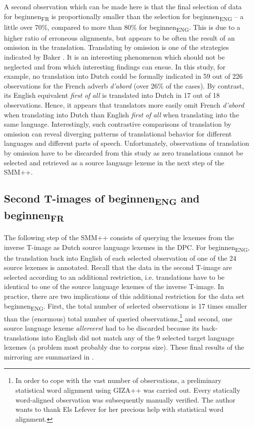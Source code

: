 A second observation which can be made here is that the final selection of data for beginnen\textsubscript{FR} is proportionally smaller than the selection for beginnen\textsubscript{ENG} – a little over 70\%, compared to more than 80\% for beginnen\textsubscript{ENG}. This is due to a higher ratio of erroneous alignments, but appears to be often the result of an omission in the translation. Translating by omission is one of the strategies indicated by Baker \citep[40]{baker_other_1992}. It is an interesting phenomenon which should not be neglected and from which interesting findings can ensue. In this study, for example, no translation into Dutch could be formally indicated in 59 out of 226 observations for the French adverb \textit{d’abord} (over 26\% of the cases). By contrast, its English equivalent \textit{first} \textit{of} \textit{all} is translated into Dutch in 17 out of 18 observations. Hence, it appears that translators more easily omit French \textit{d’abord} when translating into Dutch than English \textit{first} \textit{of} \textit{all} when translating into the same language. Interestingly, such contrastive comparisons of translation by omission can reveal diverging patterns of translational behavior for different languages and different parts of speech. Unfortunately, observations of translation by omission have to be discarded from this study as zero translations cannot be selected and retrieved as a source language lexeme in the next step of the SMM++.


\subsection{Second T-images of beginnen\textsubscript{ENG}\textsubscript{} and beginnen\textsubscript{FR}}
\label{sec:3.6.3}
The following step of the SMM++ consists of querying the lexemes from the inverse T-image as Dutch source language lexemes in the DPC. For beginnen\textsubscript{ENG}, the translation back into English of each selected observation of one of the 24 source lexemes is annotated. Recall that the data in the second T-image are selected according to an additional restriction, i.e. translations have to be identical to one of the source language lexemes of the inverse T-image. In practice, there are two implications of this additional restriction for the data set beginnen\textsubscript{ENG}. First, the total number of selected observations is 17 times smaller than the (enormous) total number of queried observations,\footnote{In order to cope with the vast number of observations, a preliminary statistical word alignment using GIZA++ was carried out. Every statically word-aligned observation was subsequently manually verified. The author wants to thank Els Lefever for her precious help with statistical word alignment.} and second, one source language lexeme \textit{allereerst} had to be discarded because its back-translations into English did not match any of the 9 selected target language lexemes (a problem most probably due to corpus size). These final results of the mirroring are summarized in .

